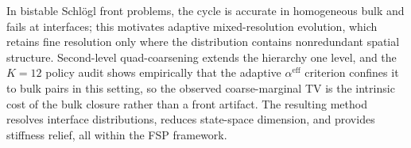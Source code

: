 \documentclass[11pt]{article}
\begin{document}
In bistable Schl\"ogl front problems, the cycle is accurate in homogeneous
bulk and fails at interfaces; this motivates adaptive mixed-resolution
evolution, which retains fine resolution only where the distribution contains
nonredundant spatial structure. Second-level quad-coarsening extends the
hierarchy one level, and the $K=12$ policy audit shows empirically that the
adaptive $\alpha^{\mathrm{eff}}$ criterion confines it to bulk pairs in this
setting, so the observed coarse-marginal TV is the intrinsic cost of the bulk
closure rather than a front artifact. The resulting method
resolves interface distributions, reduces state-space dimension, and provides
stiffness relief, all within the FSP framework.



\end{document}
